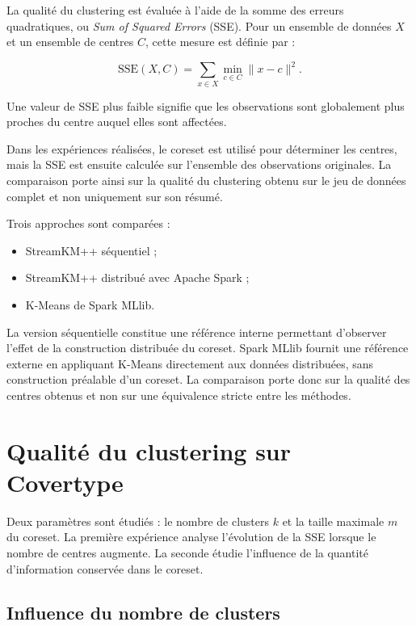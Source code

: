 La qualité du clustering est évaluée à l'aide de la somme des erreurs quadratiques, ou \emph{Sum of Squared Errors} (SSE). Pour un ensemble de données \(X\) et un ensemble de centres \(C\), cette mesure est définie par :

\[
\mathrm{SSE}(X,C)
=
\sum_{x \in X}
\min_{c \in C}
\|x-c\|^2.
\]

Une valeur de SSE plus faible signifie que les observations sont globalement plus proches du centre auquel elles sont affectées.

Dans les expériences réalisées, le coreset est utilisé pour déterminer les centres, mais la SSE est ensuite calculée sur l'ensemble des observations originales. La comparaison porte ainsi sur la qualité du clustering obtenu sur le jeu de données complet et non uniquement sur son résumé.

Trois approches sont comparées :

\begin{itemize}
    \item StreamKM++ séquentiel ;
    \item StreamKM++ distribué avec Apache Spark ;
    \item K-Means de Spark MLlib.
\end{itemize}

La version séquentielle constitue une référence interne permettant d'observer l'effet de la construction distribuée du coreset. Spark MLlib fournit une référence externe en appliquant K-Means directement aux données distribuées, sans construction préalable d'un coreset. La comparaison porte donc sur la qualité des centres obtenus et non sur une équivalence stricte entre les méthodes.

\section{Qualité du clustering sur Covertype}
\label{sec:eval-qualite}

Deux paramètres sont étudiés : le nombre de clusters \(k\) et la taille maximale \(m\) du coreset. La première expérience analyse l'évolution de la SSE lorsque le nombre de centres augmente. La seconde étudie l'influence de la quantité d'information conservée dans le coreset.

\subsection{Influence du nombre de clusters}
\label{sec:eval-k}


